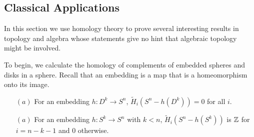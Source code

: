 \subsection{Classical Applications}
In this section we use homology theory to prove several interesting results in
topology and algebra whose statements give no hint that algebraic topology might be involved.\par
To begin, we calculate the homology of complements of embedded spheres and
disks in a sphere. Recall that an embedding is a map that is a homeomorphism onto its image.
\begin{proposition}
\mbox{}
\begin{itemize}
\item[$(a)$] For an embedding $h:D^k\to S^n$, $\widetilde{H}_i(S^n-h(D^k))=0$ for all $i$.
\item[$(a)$] For an embedding $h:S^k\to S^n$ with $k<n$, $\widetilde{H}_i(S^n-h(S^k))$ is $\mathbb{Z}$ for $i=n-k-1$ and $0$ otherwise.
\end{itemize}
\end{proposition}
